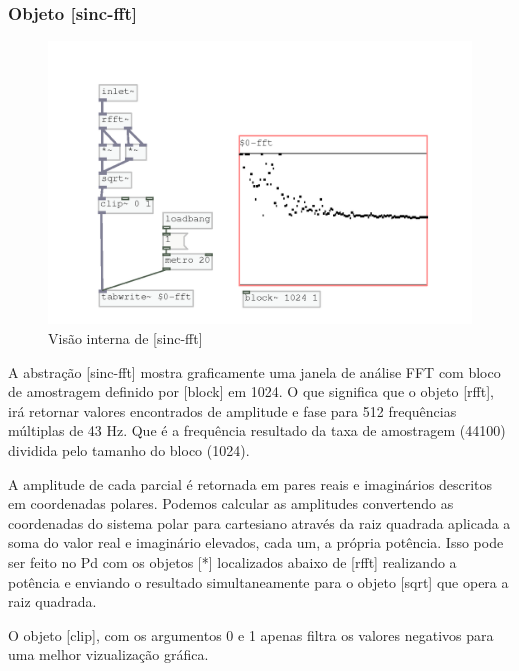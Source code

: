 \documentclass{ppgmus}
\begin{document}

\subsubsection{Objeto [sinc-fft]}


\begin{figure}
\includegraphics[scale=.55]{sinc-fft}
\caption{Visão interna de [sinc-fft]}
\label{sinc-fft}
\end{figure}



A abstração [sinc-fft] mostra graficamente uma janela de análise FFT com bloco de amostragem
definido por [block\texttildelow] em 1024. O que significa que o objeto [rfft\texttildelow],
irá retornar valores encontrados de amplitude e fase para 512 frequências múltiplas de 43 Hz.
Que é a frequência resultado da taxa de amostragem (44100) dividida pelo tamanho do bloco (1024).

A amplitude de cada parcial é retornada em pares reais e imaginários descritos em coordenadas
polares. Podemos calcular as amplitudes convertendo as coordenadas do sistema polar para cartesiano 
através da raiz quadrada aplicada
a soma do valor real e imaginário elevados, cada um, a própria potência. Isso pode ser feito no Pd com os
objetos [*\texttildelow] localizados abaixo de [rfft\texttildelow] realizando a potência e enviando o resultado 
simultaneamente para o objeto [sqrt\texttildelow] que opera a raiz quadrada.

O objeto [clip\texttildelow], com os argumentos 0 e 1 apenas filtra os valores negativos para uma
melhor vizualização gráfica.
\end{document}
